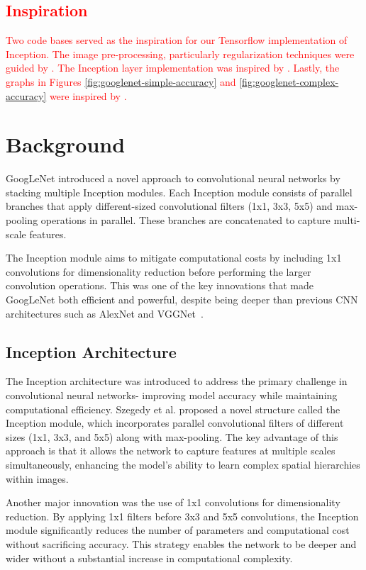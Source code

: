 \documentclass{article}
\begin{document}
\textcolor{red}{
\section{Inspiration}
Two code bases served as the inspiration for our Tensorflow implementation of Inception. The image pre-processing, particularly regularization techniques were guided by \cite{dishasai_multiclass_classification}. The Inception layer implementation was inspired by \cite{googlenet_inception_module}. Lastly, the graphs in Figures \ref{fig:googlenet-simple-accuracy} and \ref{fig:googlenet-complex-accuracy} were inspired by \cite{datacamp_cnn_tensorflow}.}

\section{Background}

GoogLeNet introduced a novel approach to convolutional neural networks by stacking multiple Inception modules. Each Inception module consists of parallel branches that apply different-sized convolutional filters (1x1, 3x3, 5x5) and max-pooling operations in parallel. These branches are concatenated to capture multi-scale features.

The Inception module aims to mitigate computational costs by including 1x1 convolutions for dimensionality reduction before performing the larger convolution operations. This was one of the key innovations that made GoogLeNet both efficient and powerful, despite being deeper than previous CNN architectures such as AlexNet and VGGNet~\cite{krizhevsky2012imagenet, simonyan2015vgg}.

\subsection{Inception Architecture}
The Inception architecture was introduced to address the primary challenge in convolutional neural networks- improving model accuracy while maintaining computational efficiency. Szegedy et al. proposed a novel structure called the Inception module, which incorporates parallel convolutional filters of different sizes (1x1, 3x3, and 5x5) along with max-pooling. The key advantage of this approach is that it allows the network to capture features at multiple scales simultaneously, enhancing the model's ability to learn complex spatial hierarchies within images.

Another major innovation was the use of 1x1 convolutions for dimensionality reduction. By applying 1x1 filters before 3x3 and 5x5 convolutions, the Inception module significantly reduces the number of parameters and computational cost without sacrificing accuracy. This strategy enables the network to be deeper and wider without a substantial increase in computational complexity.
\end{document}
